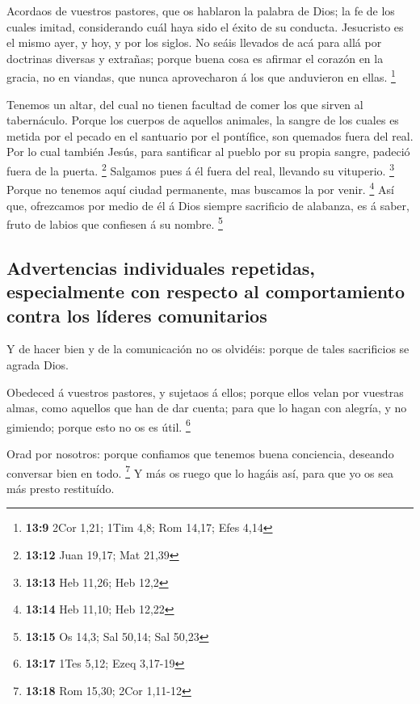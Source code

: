  Acordaos de vuestros pastores, que os hablaron la palabra
de Dios; la fe de los cuales imitad, considerando cuál haya sido el
éxito de su conducta.  Jesucristo es el mismo ayer, y hoy, y
por los siglos.  No seáis llevados de acá para allá por
doctrinas diversas y extrañas; porque buena cosa es afirmar el corazón
en la gracia, no en viandas, que nunca aprovecharon á los que anduvieron
en ellas. \footnote{\textbf{13:9} 2Cor 1,21; 1Tim 4,8; Rom 14,17; Efes
  4,14}

 Tenemos un altar, del cual no tienen facultad de comer los
que sirven al tabernáculo.  Porque los cuerpos de aquellos
animales, la sangre de los cuales es metida por el pecado en el
santuario por el pontífice, son quemados fuera del real. 
Por lo cual también Jesús, para santificar al pueblo por su propia
sangre, padeció fuera de la puerta. \footnote{\textbf{13:12} Juan 19,17;
  Mat 21,39}  Salgamos pues á él fuera del real, llevando
su vituperio. \footnote{\textbf{13:13} Heb 11,26; Heb 12,2}
 Porque no tenemos aquí ciudad permanente, mas buscamos la
por venir. \footnote{\textbf{13:14} Heb 11,10; Heb 12,22} 
Así que, ofrezcamos por medio de él á Dios siempre sacrificio de
alabanza, es á saber, fruto de labios que confiesen á su nombre.
\footnote{\textbf{13:15} Os 14,3; Sal 50,14; Sal 50,23}

\hypertarget{advertencias-individuales-repetidas-especialmente-con-respecto-al-comportamiento-contra-los-luxedderes-comunitarios}{%
\subsection{Advertencias individuales repetidas, especialmente con
respecto al comportamiento contra los líderes
comunitarios}\label{advertencias-individuales-repetidas-especialmente-con-respecto-al-comportamiento-contra-los-luxedderes-comunitarios}}

 Y de hacer bien y de la comunicación no os olvidéis:
porque de tales sacrificios se agrada Dios.

 Obedeced á vuestros pastores, y sujetaos á ellos; porque
ellos velan por vuestras almas, como aquellos que han de dar cuenta;
para que lo hagan con alegría, y no gimiendo; porque esto no os es útil.
\footnote{\textbf{13:17} 1Tes 5,12; Ezeq 3,17-19}

 Orad por nosotros: porque confiamos que tenemos buena
conciencia, deseando conversar bien en todo. \footnote{\textbf{13:18}
  Rom 15,30; 2Cor 1,11-12}  Y más os ruego que lo hagáis
así, para que yo os sea más presto restituído.

